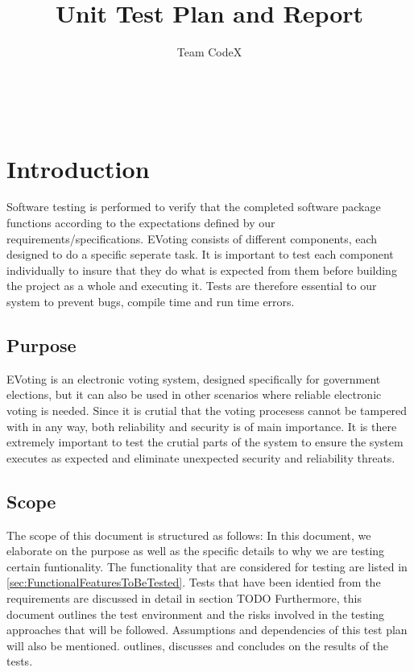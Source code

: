 \documentclass[11pt]{article}
\author{Team CodeX}
\title{Unit Test Plan and Report}
\begin{document}
	\setcounter{tocdepth}{6}
	\setcounter{secnumdepth}{6}
	\setlength{\parskip}{6pt}
	
	
	
	\renewcommand{\thesection}{\arabic{section}}
	\newpage
	
	\tableofcontents
	
	\textsc{}\\[1cm]
	
	\newpage
	
	\section{Introduction}
	Software testing is performed to verify that the completed software package functions according to the expectations defined by our requirements/specifications.\newline
	EVoting consists of different components, each designed to do a specific seperate task. It is important to test each component individually to insure that they do what is expected from them before building the project as a whole and executing it. Tests are therefore essential to our system to prevent bugs, compile time and run time errors.
	
	\subsection{Purpose}
	EVoting is an electronic voting system, designed specifically for government elections, but it can also be used in other scenarios where reliable electronic voting is needed. Since it is crutial that the voting procesess cannot be tampered with in any way, both reliability and security is of main importance. It is there extremely important to test the crutial parts of the system to ensure the system executes as expected and eliminate unexpected security and reliability threats.
	\subsection{Scope}
	The scope of this document is structured as follows:\newline
	In this document, we elaborate on the purpose as well as the specific details to why we are testing certain funtionality. The functionality that are considered for
	testing are listed in \autoref{sec:FunctionalFeaturesToBeTested}. Tests that have been identied from the requirements are discussed in detail in section TODO Furthermore, this document outlines the test environment and the risks involved in the testing approaches that will be followed. Assumptions and
	dependencies of this test plan will also be mentioned.  outlines, discusses and concludes on the results of the tests.
\end{document}
